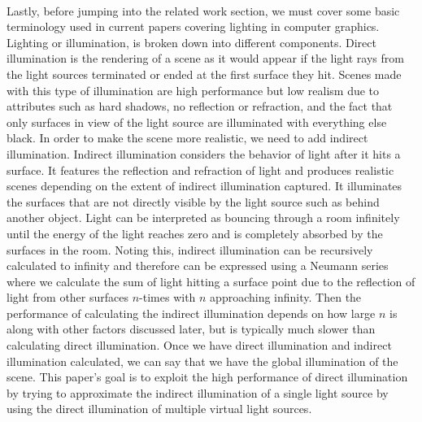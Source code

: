 \paragraph{}
Lastly, before jumping into the related work section, we must cover some basic terminology used in current papers covering lighting in computer graphics.  Lighting or illumination, is broken down into different components.  Direct illumination is the rendering of a scene as it would appear if the light rays from the light sources terminated or ended at the first surface they hit.  Scenes made with this type of illumination are high performance but low realism due to attributes such as hard shadows, no reflection or refraction, and the fact that only surfaces in view of the light source are illuminated with everything else black.  In order to make the scene more realistic, we need to add indirect illumination.  Indirect illumination considers the behavior of light after it hits a surface.  It features the reflection and refraction of light and produces realistic scenes depending on the extent of indirect illumination captured.  It illuminates the surfaces that are not directly visible by the light source such as behind another object.  Light can be interpreted as bouncing through a room infinitely until the energy of the light reaches zero and is completely absorbed by the surfaces in the room.  Noting this, indirect illumination can be recursively calculated to infinity and therefore can be expressed using a Neumann series where we calculate the sum of light hitting a surface point due to the reflection of light from other surfaces $n$-times with $n$ approaching infinity.  Then the performance of calculating the indirect illumination depends on how large $n$ is along with other factors discussed later, but is typically much slower than calculating direct illumination.  Once we have direct illumination and indirect illumination calculated, we can say that we have the global illumination of the scene.  This paper's goal is to exploit the high performance of direct illumination by trying to approximate the indirect illumination of a single light source by using the direct illumination of multiple virtual light sources.
